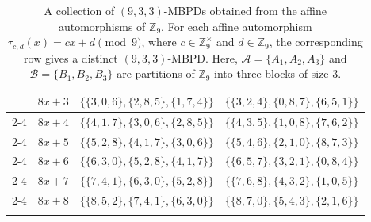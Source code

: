 \documentclass[preprint,11pt]{elsarticle}
\newcommand{\MBPD}{\textnormal{MBPD}}
\newtheorem{theorem}{Theorem}[section]
\begin{document}
\begin{center}
\begin{longtable}{|c|c|c|c|}
        & $8x+3$ & $\{\{3,0,6\}, \{2,8,5\}, \{1,7,4\}\}$ & $\{\{3,2,4\}, \{0,8,7\}, \{6,5,1\}\}$ \\ \cline{2-4}
        &  $8x+4$ & $\{\{4,1,7\}, \{3,0,6\}, \{2,8,5\}\}$ & $\{\{4,3,5\} ,\{1,0,8\}, \{7,6,2\}\}$ \\ \cline{2-4}
        & $8x+5$ & $\{\{5,2,8\}, \{4,1,7\}, \{3,0,6\}\}$ & $\{\{5,4,6\} ,\{2,1,0\}, \{8,7,3\}\}$ \\ \cline{2-4}
        & $8x+6$ & $\{\{6,3,0\}, \{5,2,8\}, \{4,1,7\}\}$ & $\{\{6,5,7\} ,\{3,2,1\}, \{0,8,4\}\}$ \\ \cline{2-4}
        & $8x+7$ & $\{\{7,4,1\}, \{6,3,0\}, \{5,2,8\}\}$ & $\{\{7,6,8\} ,\{4,3,2\}, \{1,0,5\}\}$ \\ \cline{2-4}
        & $8x+8$ & $\{\{8,5,2\}, \{7,4,1\}, \{6,3,0\}\}$ & $\{\{8,7,0\} ,\{5,4,3\}, \{2,1,6\}\}$ \\ \hline
\caption{A collection of $(9,3,3)$-MBPDs obtained from the affine automorphisms of $\mathbb{Z}_9$. For each affine automorphism $\tau_{c,d}(x)=cx+d \pmod 9$, where $c\in\mathbb{Z}_9^{\times}$ and $d\in\mathbb{Z}_9$, the corresponding row gives a distinct $(9,3,3)$-MBPD. Here, $\mathcal{A}=\{A_1,A_2,A_3\}$ and $\mathcal{B}=\{B_1,B_2,B_3\}$ are partitions of $\mathbb{Z}_9$ into three blocks of size $3$.} 
\label{tab:cfg}
\end{longtable}
\end{center}

\end{document}
